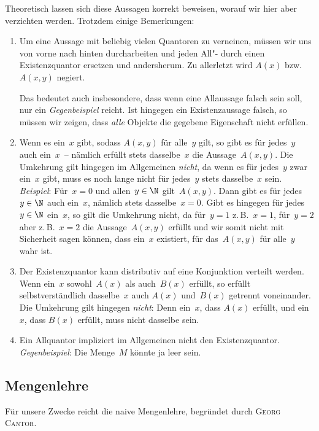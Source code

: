 \documentclass[a4paper]{article}
\begin{document}
\begin{remark}
    Theoretisch lassen sich diese Aussagen korrekt beweisen, worauf wir hier aber verzichten werden. Trotzdem einige Bemerkungen:
    \begin{enumerate}
        \item Um eine Aussage mit beliebig vielen Quantoren zu verneinen, müssen wir uns von vorne nach hinten durcharbeiten und jeden All"- durch einen Existenzquantor ersetzen und andersherum. Zu allerletzt wird $A(x)$ bzw.~$A(x, y)$ negiert.

              Das bedeutet auch insbesondere, dass wenn eine Allaussage falsch sein soll, nur ein \emph{Gegenbeispiel} reicht. Ist hingegen ein Existenzaussage falsch, so müssen wir zeigen, dass \emph{alle} Objekte die gegebene Eigenschaft nicht erfüllen.
        \item Wenn es ein~$x$ gibt, sodass $A(x, y)$ für alle~$y$ gilt, so gibt es für jedes~$y$ auch ein~$x$~-- nämlich erfüllt stets dasselbe~$x$ die Aussage~$A(x, y)$. Die Umkehrung gilt hingegen im Allgemeinen \emph{nicht}, da wenn es für jedes~$y$ zwar ein~$x$ gibt, muss es noch lange nicht für jedes~$y$ stets dasselbe~$x$ sein. \emph{Beispiel}: Für~$x = 0$ und allen~$y \in \N$ gilt~$A(x ,y)$. Dann gibt es für jedes~$y \in \N$ auch ein~$x$, nämlich stets dasselbe~$x = 0$. Gibt es hingegen für jedes~$y \in \N$ ein~$x$, so gilt die Umkehrung nicht, da für~$y = 1$ z.\,B.~$x = 1$, für~$y = 2$ aber z.\,B.~$x = 2$ die Aussage~$A(x, y)$ erfüllt und wir somit nicht mit Sicherheit sagen können, dass ein~$x$ existiert, für das~$A(x, y)$ für alle~$y$ wahr ist.
        \item Der Existenzquantor kann distributiv auf eine Konjunktion verteilt werden. Wenn ein~$x$ sowohl~$A(x)$ als auch~$B(x)$ erfüllt, so erfüllt selbstverständlich dasselbe~$x$ auch $A(x)$ und~$B(x)$ getrennt voneinander. Die Umkehrung gilt hingegen \emph{nicht}: Denn ein~$x$, dass $A(x)$ erfüllt, und ein~$x$, dass $B(x)$ erfüllt, muss nicht dasselbe sein.
        \item Ein Allquantor impliziert im Allgemeinen nicht den Existenzquantor. \emph{Gegenbeispiel}: Die Menge~$M$ könnte ja leer sein.
    \end{enumerate}
\end{remark}

\subsection{Mengenlehre}

Für unsere Zwecke reicht die naive Mengenlehre, begründet durch \textsc{Georg Cantor}.
\end{document}
